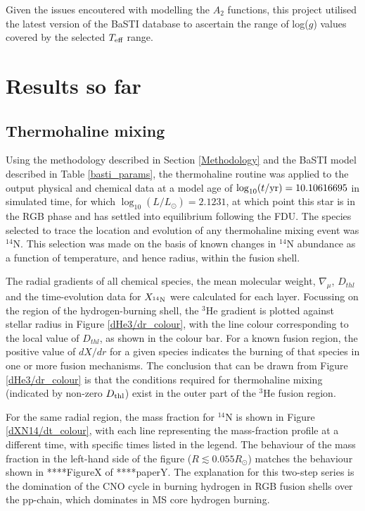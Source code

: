 \documentclass[12pt, a4paper]{report}
\begin{document}
Given the issues encoutered with modelling the $A_{2}$ functions, this project utilised the latest version of the BaSTI database \citep{2018ApJ...856..125H} to ascertain the range of log($g$) values covered by the selected $T_{\textnormal{eff}}$ range.

\chapter{Results so far}
\section{Thermohaline mixing}
Using the methodology described in Section \ref{Methodology} and the BaSTI model described in Table \ref{basti_params}, the thermohaline routine was applied to the output physical and chemical data at a model age of $\log_{10}(t/\textnormal{yr}) = 10.10616695$ in simulated time, for which $\log_{10}(L/L_{\odot}) = 2.1231$, at which point this star is in the RGB phase and has settled into equilibrium following the FDU. The species selected to trace the location and evolution of any thermohaline mixing event was $^{14}$N. This selection was made on the basis of known changes in $^{14}$N abundance as a function of temperature, and hence radius, within the fusion shell.

The radial gradients of all chemical species, the mean molecular weight, $\nabla_{\mu}$,  $D_{thl}$ and the time-evolution data for $X_{^{14}\textnormal{N}}$ were calculated for each layer. Focussing on the region of the hydrogen-burning shell, the $^{3}$He gradient is plotted against stellar radius in Figure \ref{dHe3/dr_colour}, with the line colour corresponding to the local value of $D_{thl}$, as shown in the colour bar. For a known fusion region, the positive value of $dX/dr$ for a given species indicates the burning of that species in one or more fusion mechanisms. The conclusion that can be drawn from Figure \ref{dHe3/dr_colour} is that the conditions required for thermohaline mixing (indicated by non-zero $D_{\textnormal{thl}}$) exist in the outer part of the $^{3}$He fusion region.

For the same radial region, the mass fraction for $^{14}$N is shown in Figure \ref{dXN14/dt_colour}, with each line representing the mass-fraction profile at a different time, with specific times listed in the legend. The behaviour of the mass fraction in the left-hand side of the figure ($R \lesssim 0.055R_{\odot}$) matches the behaviour shown in ****FigureX of ****paperY. The explanation for this two-step series is the domination of the CNO cycle in burning hydrogen in RGB fusion shells over the pp-chain, which dominates in MS core hydrogen burning. 
\end{document}
